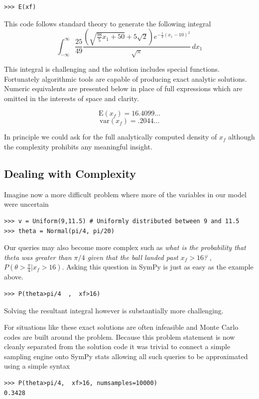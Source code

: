 \begin{lstlisting}
>>> E(xf)
\end{lstlisting}

This code follows standard theory to generate the following integral
$$\int_{-\infty}^{\infty} \frac{25}{49} \frac{\left(\sqrt{\frac{98}{5} x_{1} + 50} + 5 \sqrt{2}\right) e^{- \frac{1}{2} \left(x_{1} -10\right)^{2}}}{\sqrt{\pi}}\, dx_{1}$$

This integral is challenging and the solution includes special functions. Fortunately algorithmic tools are capable of producing exact analytic solutions. Numeric equivalents are presented below in place of full expressions which are omitted in the interests of space and clarity. 

$$\textrm{E}(x_f) = 16.4099...$$
$$\textrm{var}(x_f) = .2044...$$

In principle we could ask for the full analytically computed density of $x_f$ although the complexity prohibits any meaningful insight. 

\subsection{Dealing with Complexity}

Imagine now a more difficult problem where more of the variables in our model were uncertain
\begin{lstlisting}
>>> v = Uniform(9,11.5) # Uniformly distributed between 9 and 11.5
>>> theta = Normal(pi/4, pi/20)
\end{lstlisting}

Our queries may also become more complex such as \textit{what is the probability that theta was greater than $\pi/4$ given that the ball landed past $x_f>16$?} , $P(\theta>\frac{\pi}{4} | x_f>16)$. Asking this question in SymPy is just as easy as the example above. 
\begin{lstlisting}
>>> P(theta>pi/4  ,  xf>16)
\end{lstlisting}
Solving the resultant integral however is substantially more challenging.

For situations like these exact solutions are often infeasible and Monte Carlo codes are built around the problem. Because this problem statement is now cleanly separated from the solution code it was trivial to connect a simple sampling engine onto SymPy stats allowing all such queries to be approximated using a simple syntax
\begin{lstlisting}
>>> P(theta>pi/4,  xf>16, numsamples=10000)
0.3428
\end{lstlisting}

